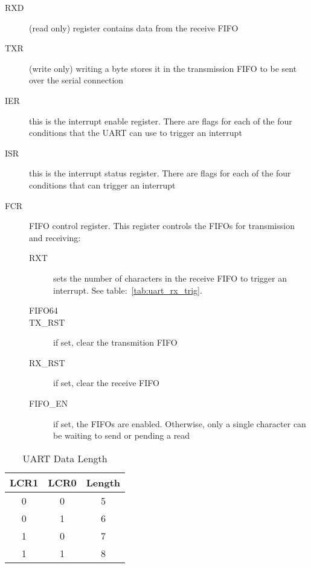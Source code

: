 \begin{description}
    \item[RXD] (read only) register contains data from the receive FIFO

    \item[TXR] (write only) writing a byte stores it in the transmission FIFO to be sent over the serial connection

    \item[IER] this is the interrupt enable register. There are flags for each of the four conditions that the UART can use to trigger an interrupt

    \item[ISR] this is the interrupt status register. There are flags for each of the four conditions that can trigger an interrupt

    \item[FCR] FIFO control register. This register controls the FIFOs for transmission and receiving:
        \begin{description}
            \item[RXT] sets the number of characters in the receive FIFO to trigger an interrupt. See table:~\ref{tab:uart_rx_trig}.

            \item[FIFO64]

            \item[TX\_RST] if set, clear the transmition FIFO

            \item[RX\_RST] if set, clear the receive FIFO

            \item[FIFO\_EN] if set, the FIFOs are enabled. Otherwise, only a single character can be waiting to send or pending a read
        \end{description}
\end{description}

\begin{table}[h]
    \begin{center}
        \begin{tabular}{|c|c|c|} \hline
            LCR1 & LCR0 & Length \\ \hline\hline
            0 & 0 & 5 \\ \hline
            0 & 1 & 6 \\ \hline
            1 & 0 & 7 \\ \hline
            1 & 1 & 8 \\ \hline
        \end{tabular}
    \end{center}
    \caption{UART Data Length}
    \label{tab:uart_data}
\end{table}

